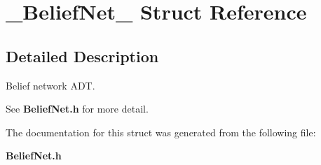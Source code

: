 \section{\_\-Belief\-Net\_\- Struct Reference}
\label{struct__BeliefNet__}


\subsection{Detailed Description}
Belief network ADT. 

See {\bf Belief\-Net.h} for more detail. 



The documentation for this struct was generated from the following file:\begin{CompactItemize}
\item 
{\bf Belief\-Net.h}\end{CompactItemize}
